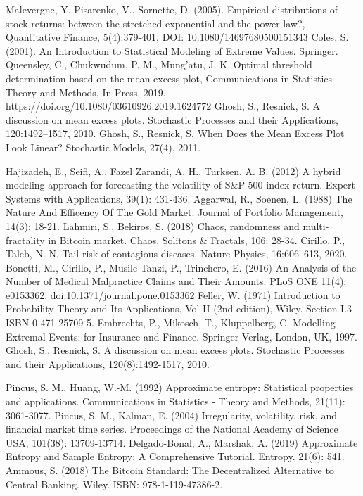 \documentclass[12pt]{article}
\begin{document}
\begin{thebibliography}{xx}
Malevergne, Y. Pisarenko, V., Sornette, D. (2005). Empirical distributions of stock returns: between the stretched exponential and the power law?, Quantitative Finance, 5(4):379-401, DOI: 10.1080/14697680500151343
Coles, S. (2001). An Introduction to Statistical Modeling of Extreme Values. Springer.
Queensley, C., Chukwudum, P. M., Mung’atu, J. K. Optimal threshold determination based on the mean excess plot, Communications in Statistics - Theory and
Methods, In Press, 2019.  https://doi.org/10.1080/03610926.2019.1624772
Ghosh, S.,  Resnick, S. A discussion on mean excess plots. Stochastic Processes and their Applications, 120:1492–1517, 2010.
Ghosh, S.,  Resnick, S. When Does the Mean Excess Plot Look Linear? Stochastic Models, 27(4), 2011.

Hajizadeh, E., Seifi, A., Fazel Zarandi, A. H., Turksen, A. B. (2012) A hybrid modeling approach for forecasting the volatility of S\&P 500 index return. Expert Systems with Applications, 39(1): 431-436.
Aggarwal, R., Soenen, L. (1988) The Nature And Efficency Of The Gold Market.  Journal of Portfolio Management, 14(3): 18-21.
Lahmiri, S., Bekiros, S. (2018) Chaos, randomness and multi-fractality in Bitcoin market. Chaos, Solitons \& Fractals, 106: 28-34.
Cirillo, P., Taleb, N. N. Tail risk of contagious diseases. Nature Physics, 16:606–613, 2020.
Bonetti, M., Cirillo, P., Musile Tanzi, P., Trinchero, E. (2016) An Analysis of the Number of Medical Malpractice Claims and Their Amounts. PLoS ONE 11(4): e0153362. doi:10.1371/journal.pone.0153362
Feller, W. (1971) Introduction to Probability Theory and Its Applications, Vol II (2nd edition), Wiley. Section I.3 ISBN 0-471-25709-5.
Embrechts, P., Mikosch, T., Kluppelberg, C. Modelling Extremal Events: for Insurance and Finance. Springer-Verlag, London, UK, 1997. 
Ghosh, S., Resnick, S. A discussion on mean excess plots. Stochastic Processes and their Applications, 120(8):1492-1517, 2010.


Pincus, S. M., Huang, W.-M. (1992) Approximate entropy: Statistical properties and applications. Communications in Statistics - Theory and Methods, 21(11): 3061-3077.
Pincus, S. M., Kalman, E. (2004) Irregularity, volatility, risk, and financial market time series. Proceedings of the National Academy of Science USA, 101(38): 13709-13714.
Delgado-Bonal, A., Marshak, A. (2019) Approximate Entropy and Sample Entropy: A Comprehensive Tutorial. Entropy. 21(6): 541.
Ammous, S. (2018) The Bitcoin Standard: The Decentralized Alternative to Central Banking. Wiley. ISBN: 978-1-119-47386-2.
\end{thebibliography}
\end{document}
